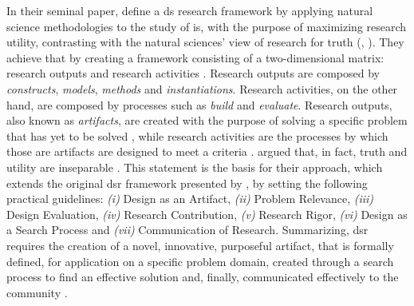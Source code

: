 In their seminal paper, \citeauthor{march_design_1995} \cite{march_design_1995} define a \gls{ds} research framework by applying natural science methodologies to the study of \gls{is}, with the purpose of maximizing research utility, contrasting with the natural sciences' view of research for truth (\cite[80]{hevner_design_2004}, \cite[253]{march_design_1995}). They achieve that by creating a framework consisting of a two-dimensional matrix: research outputs and research activities \cite[255]{march_design_1995}. Research outputs are composed by \textit{constructs}, \textit{models}, \textit{methods} and \textit{instantiations}. Research activities, on the other hand, are composed by processes such as \textit{build} and \textit{evaluate}. Research outputs, also known as \textit{artifacts}, are created with the purpose of solving a specific problem that has yet to be solved \cite[78]{hevner_design_2004}, while research activities are the processes by which those are artifacts are designed to meet a criteria \cite[79--80]{hevner_design_2004}. \citeauthor{hevner_design_2004} \cite{hevner_design_2004} argued that, in fact, truth and utility are inseparable \cite[80]{hevner_design_2004}. This statement is the basis for their approach, which extends the original \gls{dsr} framework \cite{march_design_1995} presented by \citeauthor{march_design_1995} \cite{march_design_1995}, by setting the following practical guidelines: \emph{(i)} Design as an Artifact, \emph{(ii)} Problem Relevance, \emph{(iii)} Design Evaluation, \emph{(iv)} Research Contribution, \emph{(v)} Research Rigor, \emph{(vi)} Design as a Search Process and \emph{(vii)} Communication of Research. Summarizing, \gls{dsr} requires the creation of a novel, innovative, purposeful artifact, that is formally defined, for application on a specific problem domain, created through a search process to find an effective solution and, finally, communicated effectively to the community \cite[82]{hevner_design_2004}.

